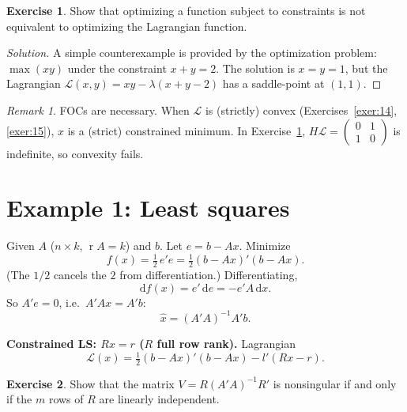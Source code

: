 \documentclass[14pt]{extarticle}
\theoremstyle{plain}
\theoremstyle{definition}
\newtheorem{exercise}{Exercise}
\theoremstyle{remark}
\newtheorem{remark}{Remark}
\newenvironment{solution}{%
  \begin{proof}[Solution]%
}{%
  \end{proof}%
}
\DeclareMathOperator{\rank}{r}
\newcommand{\dd}{\mathrm{d}}
\begin{document}
\begin{exercise}\label{exer:16}
Show that optimizing a function subject to constraints is not equivalent to optimizing the Lagrangian function.
\end{exercise}

\begin{solution}
A simple counterexample is provided by the optimization problem: $\max(xy)$ under the constraint $x + y = 2$. The solution is $x = y = 1$, but the Lagrangian $\mathcal{L}(x, y) = xy - \lambda(x + y - 2)$ has a saddle-point at $(1, 1)$.
\end{solution}

\begin{remark}
FOCs are necessary. When $\mathcal{L}$ is (strictly) convex (Exercises~\ref{exer:14}, \ref{exer:15}), $\hat{x}$ is a (strict) constrained minimum. In Exercise~\ref{exer:16}, $H\mathcal{L} = \left(\begin{smallmatrix} 0 & 1 \\ 1 & 0 \end{smallmatrix}\right)$ is indefinite, so convexity fails.
\end{remark}

\section{Example 1: Least squares}\label{sec:6}

Given $A$ ($n\times k$, $\rank A = k$) and $b$. Let $e = b - Ax$. Minimize
\begin{equation}\label{eq:26}
f(x) = \tfrac{1}{2}\, e'e = \tfrac{1}{2}(b - Ax)'(b - Ax).
\end{equation}
(The $1/2$ cancels the $2$ from differentiation.) Differentiating,
\[
\dd f(x) = e'\, \dd e = -e'A\, \dd x.
\]
So $A'e = 0$, i.e.\ $A'Ax = A'b$:
\begin{equation}\label{eq:27}
\hat{x} = (A'A)^{-1} A'b.
\end{equation}

\textbf{Constrained LS: $Rx = r$ ($R$ full row rank).} Lagrangian
\[
\mathcal{L}(x) = \tfrac{1}{2}(b - Ax)'(b - Ax) - l'(Rx - r).
\]

\begin{exercise}\label{exer:17}
Show that the matrix $V = R(A'A)^{-1}R'$ is nonsingular if and only if the $m$ rows of $R$ are linearly independent.
\end{exercise}
\end{document}
